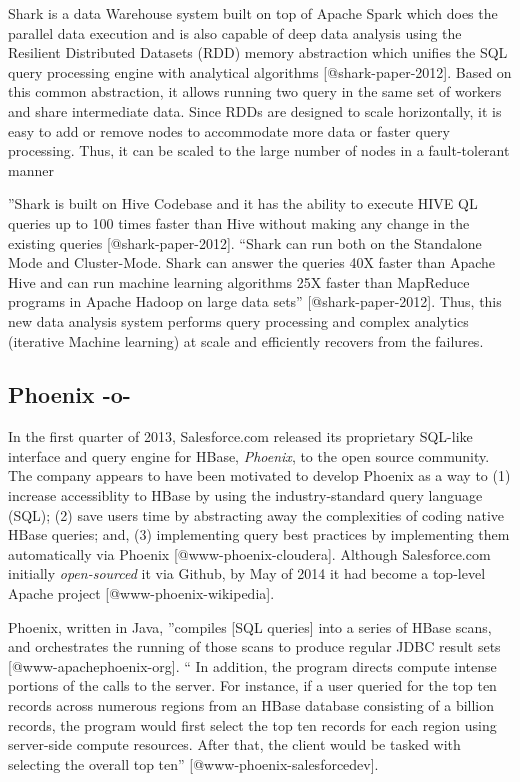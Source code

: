 Shark is a data Warehouse system built on top of Apache Spark which
does the parallel data execution and is also capable of deep data
analysis using the Resilient Distributed Datasets (RDD) memory
abstraction which unifies the SQL query processing engine with
analytical algorithms [@shark-paper-2012]. Based on this common
abstraction, it allows running two query in the same set of workers
and share intermediate data. Since RDDs are designed to scale
horizontally, it is easy to add or remove nodes to accommodate more
data or faster query processing. Thus, it can be scaled to the large
number of nodes in a fault-tolerant manner

''Shark is built on Hive Codebase and it has the ability to execute
HIVE QL queries up to 100 times faster than Hive without making any
change in the existing queries [@shark-paper-2012]. ``Shark can
run both on the Standalone Mode and Cluster-Mode. Shark can answer the
queries 40X faster than Apache Hive and can run machine learning
algorithms 25X faster than MapReduce programs in Apache Hadoop on
large data sets'' [@shark-paper-2012]. Thus, this new data
analysis system performs query processing and complex analytics
(iterative Machine learning) at scale and efficiently recovers from
the failures.

\subsection{Phoenix -o-}

In the first quarter of 2013, Salesforce.com released its proprietary
SQL-like interface and query engine for HBase, \textit{Phoenix}, to the open
source community.  The company appears to have been motivated to
develop Phoenix as a way to (1) increase accessiblity to HBase by using
the industry-standard query language (SQL); (2) save users time by
abstracting away the complexities of coding native HBase queries; and,
(3) implementing query best practices by implementing them
automatically via Phoenix [@www-phoenix-cloudera]. Although
Salesforce.com initially \textit{open-sourced} it via Github, by May of 2014
it had become a top-level Apache project [@www-phoenix-wikipedia].

Phoenix, written in Java, ''compiles [SQL queries] into a series of
HBase scans, and orchestrates the running of those scans to produce
regular JDBC result sets [@www-apachephoenix-org]. `` In addition,
the program directs compute intense portions of the calls to the
server.  For instance, if a user queried for the top ten records
across numerous regions from an HBase database consisting of a billion
records, the program would first select the top ten records for each
region using server-side compute resources.  After that, the client
would be tasked with selecting the overall top
ten'' [@www-phoenix-salesforcedev].

